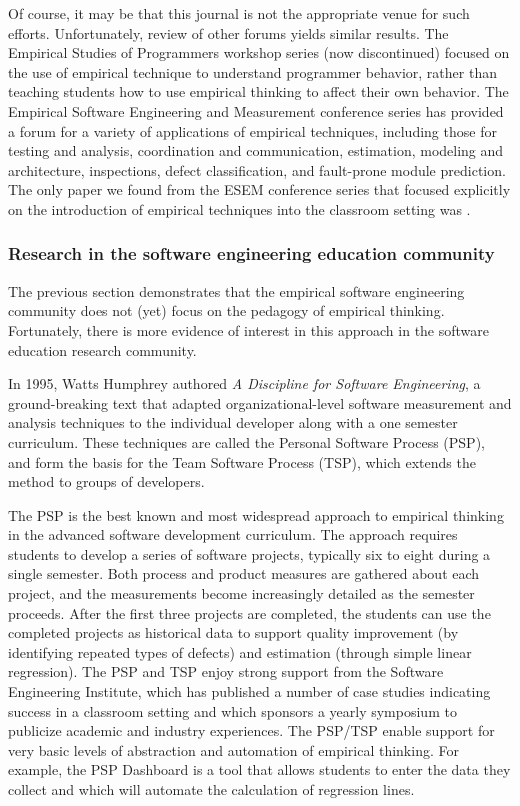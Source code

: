 Of course, it may be that this journal is not the appropriate venue for
such efforts.  Unfortunately, review of other forums yields similar
results.  The Empirical Studies of Programmers workshop series (now
discontinued) focused on the use of empirical technique to understand
programmer behavior, rather than teaching students how to use empirical
thinking to affect their own behavior.  The Empirical Software Engineering
and Measurement conference series has provided a forum for a variety of
applications of empirical techniques, including those for testing and
analysis, coordination and communication, estimation, modeling and
architecture, inspections, defect classification, and fault-prone module
prediction.  The only paper we found from the ESEM conference series
that focused explicitly on the introduction of empirical techniques into
the classroom setting was  \citep{csdl2-03-12}.

\subsubsection{Research in the software engineering education community}

The previous section demonstrates that the empirical software engineering
community does not (yet) focus on the pedagogy of empirical thinking. Fortunately, 
there is more evidence of interest in this approach in the software education 
research community.

In 1995, Watts Humphrey authored {\em A Discipline for Software
Engineering}, a ground-breaking text that adapted organizational-level
software measurement and analysis techniques to the individual developer
along with a one semester curriculum. These techniques are called the
Personal Software Process (PSP), and form the basis for the Team Software
Process (TSP), which extends the method to groups of developers. 

The PSP is the best known and most widespread approach to empirical thinking in the advanced software development curriculum.  The approach requires students to develop a series of software projects, typically six to eight during a single semester.  Both process and product measures are gathered about each project, and the measurements become increasingly detailed as the semester proceeds. After the first three projects are completed, the students can use the completed projects as historical data to support quality improvement (by identifying repeated types of defects) and estimation (through simple linear regression).  The PSP and TSP enjoy strong support from the Software Engineering Institute, which has published a number of case studies indicating success in a classroom setting and which sponsors a yearly symposium to publicize academic and industry experiences.  The PSP/TSP enable support for very basic levels of abstraction and automation of empirical thinking. For example, the PSP Dashboard is a tool that allows students to enter the data they collect and which will automate the calculation of regression lines. 

